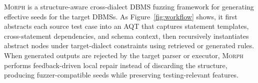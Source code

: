 \documentclass[conference]{IEEEtran}
\newcommand{\tool}{\textsc{Morph}\xspace}
\begin{document}
\tool{} is a structure-aware cross-dialect DBMS fuzzing framework for generating effective seeds for the target DBMSs.
As Figure~\ref{fig:workflow} shows, 
it first abstracts each source test case into an AQT that captures statement templates, cross-statement dependencies, and schema context, then recursively instantiates abstract nodes under target-dialect constraints using retrieved or generated rules.
When generated outputs are rejected by the target parser or executor, \tool{} performs feedback-driven local repair instead of discarding the structure, producing fuzzer-compatible seeds while preserving testing-relevant features.

\end{document}
